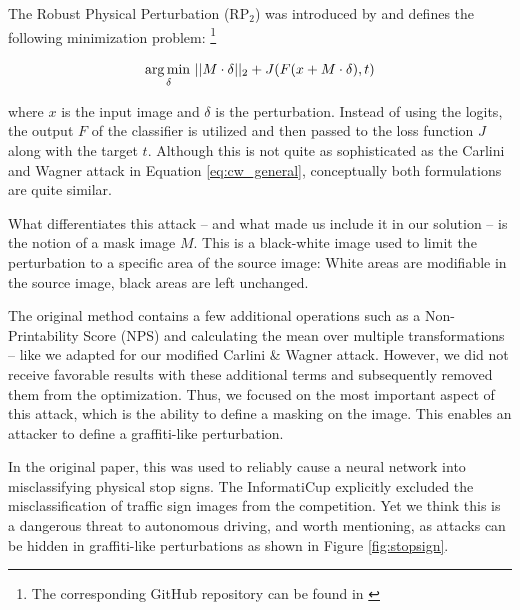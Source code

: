 The Robust Physical Perturbation (RP$_2$) was introduced by \citet{eykholt2018robust} and defines the following minimization problem:
\footnote{The corresponding GitHub repository can be found in \cite{rp2repo}}

\begin{equation}
\operatorname*{arg\,min\,}_\delta ||M \cdot \delta||_2 + J(F(x + M \cdot \delta), t)
\end{equation}

where $x$ is the input image and $\delta$ is the perturbation. Instead of using the logits, the output $F$ of the classifier is utilized and then passed to the loss function $J$ along with the target $t$. Although this is not quite as sophisticated as the Carlini and Wagner attack in Equation \ref{eq:cw_general}, conceptually both formulations are quite similar.

What differentiates this attack -- and what made us include it in our solution -- is the notion of a mask image $M$. 
This is a black-white image used to limit the perturbation to a specific area of the source image: White areas are modifiable in the source image, black areas are left unchanged.

The original method contains a few additional operations such as a Non-Printability Score (NPS) and calculating the mean over multiple transformations -- like we adapted for our modified Carlini \& Wagner attack.
However, we did not receive favorable results with these additional terms and subsequently removed them from the optimization.
Thus, we focused on the most important aspect of this attack, which is the ability to define a masking on the image.
This enables an attacker to define a graffiti-like perturbation.

In the original paper, this was used to reliably cause a neural network into misclassifying physical stop signs.
The InformatiCup explicitly excluded the misclassification of traffic sign images from the competition.
Yet we think this is a dangerous threat to autonomous driving, and worth mentioning, as attacks can be hidden in graffiti-like perturbations as shown in Figure \ref{fig:stopsign}.

